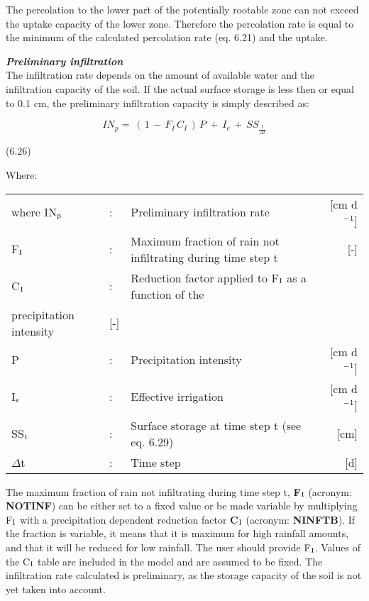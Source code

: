  
The percolation to the lower part of the potentially rootable zone can not exceed the
uptake capacity of the lower zone. Therefore the percolation rate is equal to the minimum
of the calculated percolation rate (eq. 6.21) and the uptake.



{\it {\bf Preliminary infiltration}\/}\\
The infiltration rate depends on the amount of available water and the infiltration capacity
of the soil. If the actual surface storage is less then or equal to 0.1 cm, the preliminary
infiltration capacity is simply described as:

\begin{equation}
IN_{p} =~ (\, 1\, -\, F _{I} \, C _{I} \, )\, P~+~ I _{e~} +~ SS _{\frac{t}{ \Delta t}} 
\end{equation}

 
\strut\hfill (6.26)

Where:\\
\begin{tabularx}{\textwidth}{llXr}



where IN$_{{\rm p}}$ &:& Preliminary infiltration rate  & [cm d$^{{\rm -1}}$]\\
F$_{{\rm I}}$ &:& Maximum fraction of rain not infiltrating during time step t  & [-]\\
C$_{{\rm I}}$ &:& Reduction factor applied to F$_{{\rm I}}$ as a function of the \\
   precipitation intensity  & [-]\\
P &:& Precipitation intensity  & [cm d$^{{\rm -1}}$]\\
I$_{{\rm e}}$ &:& Effective irrigation  & [cm d$^{{\rm -1}}$]\\
SS$_{{\rm t}}$ &:& Surface storage at time step t (see eq. 6.29)  & [cm]\\
$\Delta$t &:& Time step  & [d]
\end{tabularx}

The maximum fraction of rain not infiltrating during time step t, {\bf F$_{{\rm I}}$} (acronym: {\bf NOTINF})
can be either set to a fixed value or be made variable by multiplying F$_{{\rm I}}$ with a precipita\-tion dependent reduction factor {\bf C$_{{\rm I}}$} (acronym: {\bf NINFTB}). If the fraction is variable, it
means that it is maximum for high rainfall amounts, and that it will be reduced for low
rainfall. The user should provide F$_{{\rm I}}$. Values of the C$_{{\rm I}}$ table are included in the model and
are assumed to be fixed. The infiltration rate calculated is preliminary, as the storage
capacity of the soil is not yet taken into account. 


